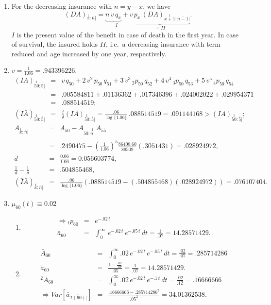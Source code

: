 \documentclass[11pt,fleqn,oneside]{book}
\begin{document}
\begin{enumerate}
\item For the decreasing insurance with $n=y-x$, we have
$$
{\left(DA\right)_{\stackrel{1}{x}:\overline{n}|}} = \underbrace{n\,v\,q_x}_{=I} + \underbrace{v\,p_x\,{\left(DA\right)_{\stackrel{1}{x+1}:\overline{n-1}|}}}_{=II}.
$$
$I$ is the present value of the benefit in case of death in the first year. In case of survival, the insured holds $II$, i.e.\ a decreasing insurance with term reduced and age increased by one year, respectively.
\item $v=\frac{1}{1.06} = .943396226.$
\begin{eqnarray*}
{\left(IA\right)_{\stackrel{1}{50}:\overline{5}|}} &=& v\,q_{50} + 2\,v^2\,p_{50}\,q_{51} + 3\,v^3\,{_2p_{50}}\,q_{52} + 4\,v^4\,{_3p_{50}}\,q_{53} + 5\,v^5\,{_4p_{50}}\,q_{54}\\
&=& .005584811 + .01136362 + .017346396 + .024002022 + .029954371 \\
&=& .088514519;\\
{\left(I\bar{A}\right)_{\stackrel{1}{50}:\overline{5}|}} &=& \frac{i}{\delta}  {\left(IA\right)_{\stackrel{1}{50}:\overline{5}|}} = \frac{.06}{\log\{1.06\}} \, .088514519 = .091144168 > {\left(IA\right)_{\stackrel{1}{50}:\overline{5}|}}; 
\end{eqnarray*}
\begin{eqnarray*}
{A_{\stackrel{1}{x}:\overline{n}|}} &=& {A_{50}} - {A_{50:\stackrel{1}{\overline{n}|}}} \,{A_{55}}\\
&=& .2490475 - \left(\frac{1}{1.06}\right)^5 \frac{86408.60}{89509}(.3051431) = .028924972,\\
d &=& \frac{0.06}{1.06} = 0.056603774,\\
\frac{1}{d} - \frac{1}{\delta} &=& .504855468,\\
{\left(\bar{I}\bar{A}\right)_{\stackrel{1}{x}:\overline{n}|}} &=& 
\frac{.06}{\log\{1.06\}}  \left(.088514519  - (.504855468)(.028924972)\right) = .076107404.
\end{eqnarray*}
\item $\mu_{60}(t) \equiv 0.02$
\begin{enumerate}
\item 
\begin{eqnarray*}
\Rightarrow {_tp_{60}} &=& e^{-.02\,t}\\
{\bar{a}_{60}} &=& \int_0^{\infty} \,e^{-.02\,t}\,e^{-.05\,t}\,dt = \frac{1}{.07} = 14.28571429.
\end{eqnarray*}
\item
\begin{eqnarray*}
{\bar{A}_{60}} &=& \int_0^{\infty} .02 \,e^{-.02\,t}\,e^{-.05\,t}\,dt = \frac{.02}{.07} = .285714286\\
{\bar{a}_{60}} &=& \frac{1 - \frac{.02}{.07}}{.05} = \frac{1}{.07} = 14.28571429.\\
{^2\bar{A}_{60}} &=& \int_0^{\infty} .02 \,e^{-.02\,t}\,e^{-.1\,t}\,dt = \frac{.02}{.12} = .16666666\\
\Rightarrow Var[{\bar{a}_{\overline{T(60)}|}}] &=& \frac{.16666666 - .285714286^2}{.05^2} = 34.01362538.
\end{eqnarray*}
\end{enumerate}
\end{enumerate}
\end{document}
